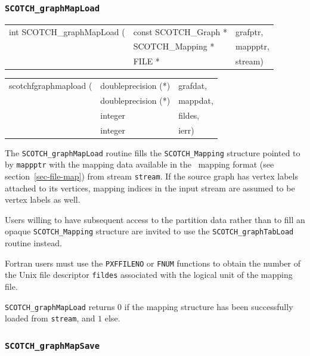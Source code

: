\subsubsection{{\tt SCOTCH\_graphMapLoad}}
\label{sec-lib-graph-map-load}

\begin{itemize}
\progsyn

{\tt\begin{tabular}{l@{}ll}
int SCOTCH\_graphMapLoad ( & const SCOTCH\_Graph * & grafptr, \\
                           & SCOTCH\_Mapping *     & mappptr, \\
                           & FILE *                & stream)
\end{tabular}}

{\tt\begin{tabular}{l@{}ll}
scotchfgraphmapload ( & doubleprecision (*) & grafdat, \\
                      & doubleprecision (*) & mappdat, \\
                      & integer             & fildes, \\
                      & integer             & ierr)
\end{tabular}}

\progdes

The {\tt SCOTCH\_graphMapLoad} routine fills the
{\tt SCOTCH\_\lbt Mapping} structure pointed to by
{\tt mappptr} with the mapping data available in
the \scotch\ mapping format (see section~\ref{sec-file-map})
from stream {\tt stream}. If the source graph has vertex labels
attached to its vertices, mapping indices in the input stream are
assumed to be vertex labels as well.

Users willing to have subsequent access to the partition data
rather than to fill an opaque {\tt SCOTCH\_\lbt Mapping} structure
are invited to use the {\tt SCOTCH\_\lbt graph\lbt Tab\lbt Load}
routine instead.

Fortran users must use the {\tt PXFFILENO} or {\tt FNUM} functions to
obtain the number of the Unix file descriptor {\tt fildes} associated
with the logical unit of the mapping file.

\progret

{\tt SCOTCH\_graphMapLoad} returns $0$ if the mapping structure
has been successfully loaded from {\tt stream}, and $1$ else.
\end{itemize}

\subsubsection{{\tt SCOTCH\_graphMapSave}}

